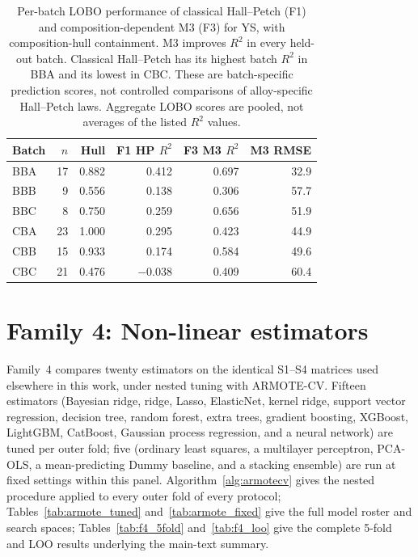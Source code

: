\documentclass[a4paper,11pt]{article}
\newcommand{\familyfour}{Non-linear estimators}
\begin{document}
\begin{table}[H]
\centering
\caption{Per-batch LOBO performance of classical Hall--Petch (F1) and composition-dependent M3 (F3) for YS, with composition-hull containment. M3 improves $R^2$ in every held-out batch. Classical Hall--Petch has its highest batch $R^2$ in BBA and its lowest in CBC. These are batch-specific prediction scores, not controlled comparisons of alloy-specific Hall--Petch laws. Aggregate LOBO scores are pooled, not averages of the listed $R^2$ values.}
\label{tab:batch}
\small
\begin{tabular}{lrrrrr}
\toprule
Batch & $n$ & Hull & F1 HP $R^2$ & F3 M3 $R^2$ & M3 RMSE \\
\midrule
BBA & 17 & 0.882 & 0.412 & 0.697 & 32.9 \\
BBB & 9 & 0.556 & 0.138 & 0.306 & 57.7 \\
BBC & 8 & 0.750 & 0.259 & 0.656 & 51.9 \\
CBA & 23 & 1.000 & 0.295 & 0.423 & 44.9 \\
CBB & 15 & 0.933 & 0.174 & 0.584 & 49.6 \\
CBC & 21 & 0.476 & $-0.038$ & 0.409 & 60.4 \\
\bottomrule
\end{tabular}
\end{table}

\section{Family 4: \familyfour}
\label{si:ml}

Family~4 compares twenty estimators on the identical S1--S4 matrices used elsewhere in this work, under nested tuning with ARMOTE-CV. Fifteen estimators (Bayesian ridge, ridge, Lasso, ElasticNet, kernel ridge, support vector regression, decision tree, random forest, extra trees, gradient boosting, XGBoost, LightGBM, CatBoost, Gaussian process regression, and a neural network) are tuned per outer fold; five (ordinary least squares, a multilayer perceptron, PCA-OLS, a mean-predicting Dummy baseline, and a stacking ensemble) are run at fixed settings within this panel. 
Algorithm~\ref{alg:armotecv} gives the nested procedure applied to every outer fold of every protocol; Tables~\ref{tab:armote_tuned} and~\ref{tab:armote_fixed} give the full model roster and search spaces; Tables~\ref{tab:f4_5fold} and~\ref{tab:f4_loo} give the complete 5-fold and LOO results underlying the main-text summary.
\end{document}
